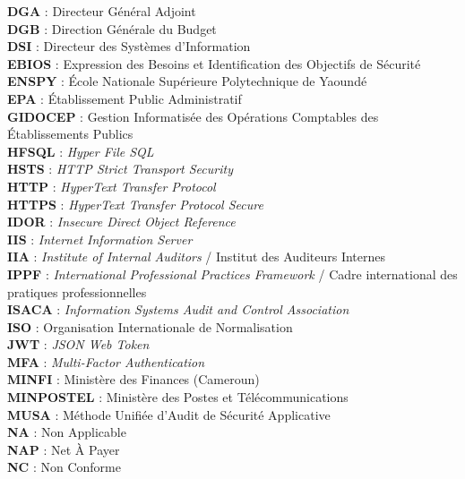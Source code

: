 \documentclass[12pt,a4paper,oneside]{report}
\begin{document}
\textbf{DGA} : Directeur Général Adjoint\\[2pt]
\textbf{DGB} : Direction Générale du Budget\\[2pt]
\textbf{DSI} : Directeur des Systèmes d'Information\\[2pt]
\textbf{EBIOS} : Expression des Besoins et Identification des Objectifs de Sécurité\\[2pt]
\textbf{ENSPY} : École Nationale Supérieure Polytechnique de Yaoundé\\[2pt]
\textbf{EPA} : Établissement Public Administratif\\[2pt]
\textbf{GIDOCEP} : Gestion Informatisée des Opérations Comptables des Établissements Publics\\[2pt]
\textbf{HFSQL} : \textit{Hyper File SQL}\\[2pt]
\textbf{HSTS} : \textit{HTTP Strict Transport Security}\\[2pt]
\textbf{HTTP} : \textit{HyperText Transfer Protocol}\\[2pt]
\textbf{HTTPS} : \textit{HyperText Transfer Protocol Secure}\\[2pt]
\textbf{IDOR} : \textit{Insecure Direct Object Reference}\\[2pt]
\textbf{IIS} : \textit{Internet Information Server}\\[2pt]
\textbf{IIA} : \textit{Institute of Internal Auditors} / Institut des Auditeurs Internes\\[2pt]
\textbf{IPPF} : \textit{International Professional Practices Framework} / Cadre international des pratiques professionnelles\\[2pt]
\textbf{ISACA} : \textit{Information Systems Audit and Control Association}\\[2pt]
\textbf{ISO} : Organisation Internationale de Normalisation\\[2pt]
\textbf{JWT} : \textit{JSON Web Token}\\[2pt]
\textbf{MFA} : \textit{Multi-Factor Authentication}\\[2pt]
\textbf{MINFI} : Ministère des Finances (Cameroun)\\[2pt]
\textbf{MINPOSTEL} : Ministère des Postes et Télécommunications\\[2pt]
\textbf{MUSA} : Méthode Unifiée d'Audit de Sécurité Applicative\\[2pt]
\textbf{NA} : Non Applicable\\[2pt]
\textbf{NAP} : Net À Payer\\[2pt]
\textbf{NC} : Non Conforme\\[2pt]
\end{document}
